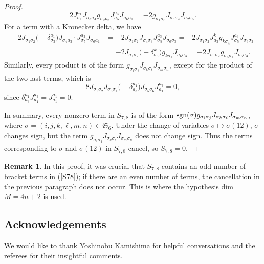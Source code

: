 \documentclass[pdftex]{sigma}
\numberwithin{equation}{section}
\theoremstyle{definition}
\newtheorem{Remark}[Theorem]{Remark}
\newcommand{\sgn}{{\rm sgn}}
\newcommand{\om}{\overline{M}}
\begin{document}
\begin{proof}
\[2J_{\sigma_1}^{a_1}J_{\sigma_3\sigma_4}g_{\sigma_2a_3}J_{\sigma_5}^{a_3}J_{\sigma_6a_1}
= -2g_{\sigma_1\sigma_6}J_{\sigma_3\sigma_4}J_{\sigma_2\sigma_5}.\]
For a term with a Kronecker delta, we have
\begin{align*}-2J_{\sigma_1\sigma_2}\bigl(-\delta_{\sigma_3}^{a_1}\bigr)J_{\sigma_4a_3}\cdot J_{\sigma_5}^{a_3}J_{\sigma_6a_1}
&= -2J_{\sigma_1\sigma_2}J_{\sigma_4\sigma_3}J^{a_3}_{\sigma_5}J_{\sigma_6\sigma_3}
= -2J_{\sigma_1\sigma_2}J^k_{a_3}g_{k\sigma_4}J^{a_3}_{\sigma_5}J_{\sigma_6\sigma_3}\\
&= -2J_{\sigma_1\sigma_2}\bigl(-\delta^k_{\sigma_5}\bigr)g_{k\sigma_4}J_{\sigma_6\sigma_3}
= -2J_{\sigma_1\sigma_2}g_{\sigma_5\sigma_4}J_{\sigma_6\sigma_3}.
\end{align*}
Similarly, every product is of the form $g_{\sigma_i\sigma_j} J_{\sigma_k\sigma_\ell}J_{\sigma_m\sigma_n}$,
except for the product of the two last terms, which is
\[8J_{\sigma_1\sigma_2}J_{\sigma_3\sigma_4}\bigl(-\delta_{a_3}^{a_1}\bigr)J_{\sigma_5\sigma_6}J_{a_1}^{a_3}
=0,\]
since $\delta_{a_3}^{a_1}J_{a_1}^{a_3} = J_{a_1}^{a_1} = 0$.

In summary, every nonzero term in $S_{7,8}$ is of the form $\sgn(\sigma)g_{\sigma_i\sigma_j} J_{\sigma_k\sigma_\ell}J_{\sigma_m\sigma_n}$, where $\sigma = (i,j,k,\ell,m,n)\in \mathfrak S_6$. Under the change of variables $\sigma\mapsto \sigma(12)$, $\sigma$ changes sign, but the term
$g_{\sigma_i\sigma_j} J_{\sigma_k\sigma_\ell}J_{\sigma_m\sigma_n}$ does not change sign. Thus the terms corresponding to $\sigma$ and $\sigma(12)$ in $S_{7,8}$ cancel, so $S_{7,8} = 0$.
\end{proof}

\begin{Remark} In this proof, it was crucial that $S_{7,8}$ contains an odd number of bracket terms in (\ref{S78}); if there are an even number of terms, the cancellation in the previous paragraph does not occur. This is
where the hypothesis dim $\om = 4n+2$ is used.
\end{Remark}

\subsection*{Acknowledgements}

We would like to thank Yoshinobu Kamishima for helpful conversations and the referees for their insightful comments.
\end{document}
